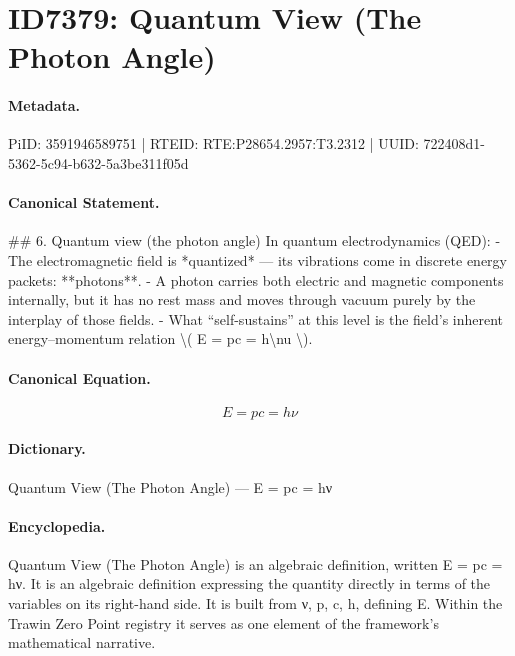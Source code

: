 \section*{ID7379: Quantum View (The Photon Angle)}
\paragraph{Metadata.}
PiID: 3591946589751 | RTEID: RTE:P28654.2957:T3.2312 | UUID: 722408d1-5362-5c94-b632-5a3be311f05d

\paragraph{Canonical Statement.}
\#\# 6. Quantum view (the photon angle) In quantum electrodynamics (QED): - The electromagnetic field is *quantized* — its vibrations come in discrete energy packets: **photons**. - A photon carries both electric and magnetic components internally, but it has no rest mass and moves through vacuum purely by the interplay of those fields. - What “self-sustains” at this level is the field’s inherent energy–momentum relation \textbackslash{}( E = pc = h\textbackslash{}nu \textbackslash{}).

\paragraph{Canonical Equation.}
\[
E = pc = h\nu
\]

\paragraph{Dictionary.}
Quantum View (The Photon Angle) — E = pc = hν

\paragraph{Encyclopedia.}
Quantum View (The Photon Angle) is an algebraic definition, written E = pc = hν. It is an algebraic definition expressing the quantity directly in terms of the variables on its right-hand side. It is built from ν, p, c, h, defining E. Within the Trawin Zero Point registry it serves as one element of the framework's mathematical narrative.
